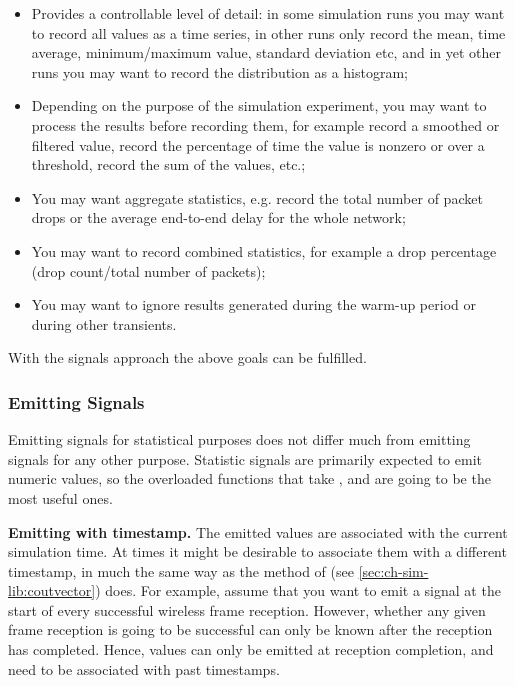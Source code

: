\begin{itemize}
 \item Provides a controllable level of detail: in some simulation runs
    you may want to record all values as a time series, in other runs
    only record the mean, time average, minimum/maximum value, standard
    deviation etc, and in yet other runs you may want to record the
    distribution as a histogram;
 \item Depending on the purpose of the simulation experiment, you may want
    to process the results before recording them, for example
    record a smoothed or filtered value, record the percentage of time the
    value is nonzero or over a threshold, record the sum of the values, etc.;
 \item You may want aggregate statistics, e.g. record the total number
    of packet drops or the average end-to-end delay for the whole network;
 \item You may want to record combined statistics, for example a drop
    percentage (drop count/total number of packets);
 \item You may want to ignore results generated during the warm-up period
    or during other transients.
\end{itemize}

With the signals approach the above goals can be fulfilled.


\subsubsection{Emitting Signals}

Emitting signals for statistical purposes does not differ much from
emitting signals for any other purpose. Statistic signals are primarily
expected to emit numeric values, so the overloaded  functions
that take ,  and  are going to be the
most useful ones.

\textbf{Emitting with timestamp.} The emitted values are associated with
the current simulation time. At times it might be desirable to associate
them with a different timestamp, in much the same way as the
 method of  (see
\ref{sec:ch-sim-lib:coutvector}) does. For example, assume that you want to
emit a signal at the start of every successful wireless frame reception.
However, whether any given frame reception is going to be successful can
only be known after the reception has completed. Hence, values can only be
emitted at reception completion, and need to be associated with past
timestamps.


